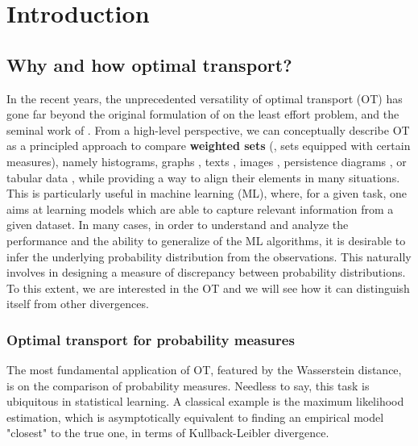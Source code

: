 \chapter[Introduction]{Introduction}


\renewcommand{\contentsname}{Contents}
\localtableofcontents*
{}

\section{Why and how optimal transport?}

In the recent years, the unprecedented versatility of optimal transport (OT) has gone far beyond
the original formulation of \citet{Monge81} on the least effort problem,
and the seminal work of \citet{Kanto42}. From a high-level perspective, we can
conceptually describe OT as a principled approach to compare \textbf{weighted sets}
(\ie, sets equipped with certain measures), namely histograms, graphs \citep{Nikolentzos17},
texts \citep{Kusner15}, images \citep{Arjovsky17}, persistence diagrams \citep{Edelsbrunner02},
or tabular data \citep{Redko20}, while providing a way to align their elements in
many situations. This is particularly useful in machine learning (ML), where, for a given task,
one aims at learning models which are able to capture relevant information from a given dataset.
In many cases, in order to understand and analyze the performance and the ability to generalize
of the ML algorithms,
it is desirable to infer the underlying probability distribution from the observations.
This naturally involves in designing a measure of discrepancy between probability distributions.
To this extent, we are interested in the OT and we will
see how it can distinguish itself from other divergences.

\subsection{Optimal transport for probability measures}
The most fundamental application of OT, featured by the Wasserstein distance,
is on the comparison of probability measures. Needless to say,
this task is ubiquitous in statistical learning. A classical example is
the maximum likelihood estimation,
which is asymptotically equivalent to finding an empirical model "closest" to the true one,
in terms of Kullback-Leibler divergence.

